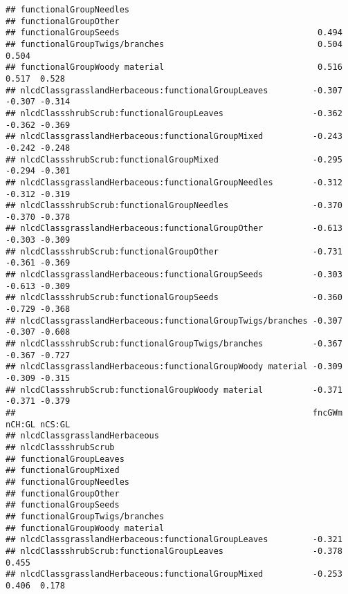 \documentclass[]{article}
\begin{document}
\begin{verbatim}
## functionalGroupNeedles                                                         
## functionalGroupOther                                                           
## functionalGroupSeeds                                        0.494              
## functionalGroupTwigs/branches                               0.504  0.504       
## functionalGroupWoody material                               0.516  0.517  0.528
## nlcdClassgrasslandHerbaceous:functionalGroupLeaves         -0.307 -0.307 -0.314
## nlcdClassshrubScrub:functionalGroupLeaves                  -0.362 -0.362 -0.369
## nlcdClassgrasslandHerbaceous:functionalGroupMixed          -0.243 -0.242 -0.248
## nlcdClassshrubScrub:functionalGroupMixed                   -0.295 -0.294 -0.301
## nlcdClassgrasslandHerbaceous:functionalGroupNeedles        -0.312 -0.312 -0.319
## nlcdClassshrubScrub:functionalGroupNeedles                 -0.370 -0.370 -0.378
## nlcdClassgrasslandHerbaceous:functionalGroupOther          -0.613 -0.303 -0.309
## nlcdClassshrubScrub:functionalGroupOther                   -0.731 -0.361 -0.369
## nlcdClassgrasslandHerbaceous:functionalGroupSeeds          -0.303 -0.613 -0.309
## nlcdClassshrubScrub:functionalGroupSeeds                   -0.360 -0.729 -0.368
## nlcdClassgrasslandHerbaceous:functionalGroupTwigs/branches -0.307 -0.307 -0.608
## nlcdClassshrubScrub:functionalGroupTwigs/branches          -0.367 -0.367 -0.727
## nlcdClassgrasslandHerbaceous:functionalGroupWoody material -0.309 -0.309 -0.315
## nlcdClassshrubScrub:functionalGroupWoody material          -0.371 -0.371 -0.379
##                                                            fncGWm nCH:GL nCS:GL
## nlcdClassgrasslandHerbaceous                                                   
## nlcdClassshrubScrub                                                            
## functionalGroupLeaves                                                          
## functionalGroupMixed                                                           
## functionalGroupNeedles                                                         
## functionalGroupOther                                                           
## functionalGroupSeeds                                                           
## functionalGroupTwigs/branches                                                  
## functionalGroupWoody material                                                  
## nlcdClassgrasslandHerbaceous:functionalGroupLeaves         -0.321              
## nlcdClassshrubScrub:functionalGroupLeaves                  -0.378  0.455       
## nlcdClassgrasslandHerbaceous:functionalGroupMixed          -0.253  0.406  0.178

\end{verbatim}
\end{document}
